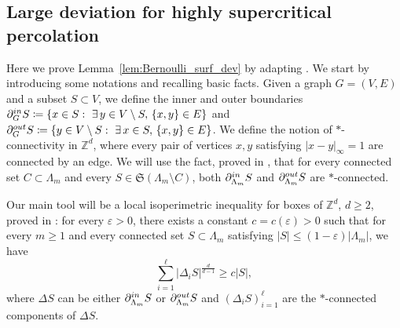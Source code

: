 \documentclass[11pt,a4paper]{article}
\theoremstyle{definition}
\numberwithin{equation}{section}
\newcommand\Z{\mathbb{Z}}
\begin{document}
\subsection{Large deviation for highly supercritical percolation}\label{sec:appendix_high_perco}

Here we prove Lemma~\ref{lem:Bernoulli_surf_dev} by adapting \cite{DP96}. We start by introducing some notations and recalling basic facts. Given a graph $G=(V,E)$ and a subset $S\subset V$, we define the inner and outer boundaries  $\partial^{\rm in}_G S\coloneqq\{x\in S:~\exists\, y\in V\setminus S,\, \{x,y\}\in E\}$ and $\partial^{\rm out}_G S\coloneqq\{y\in V\setminus S:~\exists\, x\in S,\, \{x,y\}\in E\}$. We define the notion of $*$-connectivity in $\Z^d$, where every pair of vertices $x,y$ satisfying $|x-y|_\infty=1$ are connected by an edge. 
We will use the fact, proved in \cite[Lemma 2.1 (ii)]{DP96}, that for every connected set $C\subset \Lambda_m$ and every $S\in\mathfrak{S}(\Lambda_m\setminus C)$, both $\partial^{\rm in}_{\Lambda_m} S$ and $\partial^{\rm out}_{\Lambda_m} S$ are $*$-connected. 

Our main tool will be a local isoperimetric inequality for boxes of $\Z^d$, $d\geq2$, proved in \cite[Proposition 2.2]{DP96}: for every $\varepsilon>0$, there exists a constant $c=c(\varepsilon)>0$ such that for every $m\geq 1$ and every connected set $S\subset \Lambda_m$ satisfying $|S|\leq (1-\varepsilon)|\Lambda_m|$, we have
\begin{equation}\label{eq:local_isoperimetric_ineq}
    \sum_{i=1}^{\ell} |\Delta_i S|^{\frac{d}{d-1}} \geq c |S|,
\end{equation}
where $\Delta S$ can be either $\partial^{\rm in}_{\Lambda_m} S$ or $\partial^{\rm out}_{\Lambda_m} S$ and $(\Delta_i S)_{i=1}^{\ell}$ are the $*$-connected components of $\Delta S$. 
\end{document}
